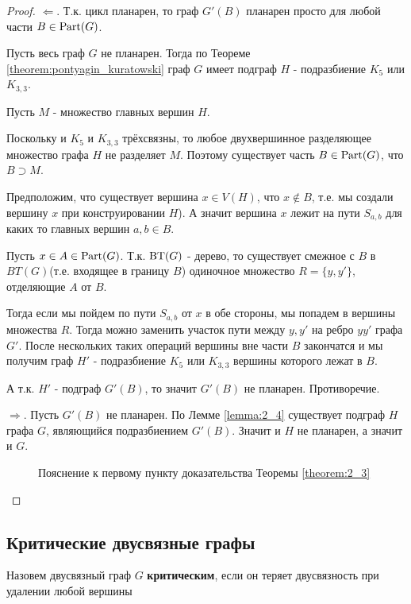 \begin{proof}
	$\Longleftarrow$. Т.к. цикл планарен, то граф $G'(B)$ планарен просто для любой части  $B \in \operatorname{Part}(G)$.

	Пусть весь граф $G$ не планарен. Тогда по Теореме \ref{theorem:pontyagin_kuratowski} граф  $G$ имеет подграф  $H$ - подразбиение  $K_5$ или  $K_{3,3}$.

	Пусть $M$ - множество главных вершин  $H$.

	Поскольку и $K_5$ и  $K_{3,3}$ трёхсвязны, то любое двухвершинное разделяющее множество графа  $H$ не разделяет $M$.
	Поэтому существует часть  $B \in \operatorname{Part}(G)$, что  $B \supset M$.

	Предположим, что существует вершина $x \in V(H)$, что  $x \not \in B$, т.е. мы создали вершину $x$ при конструировании  $H$).
	А значит вершина $x$ лежит на пути  $S_{a, b}$ для каких то главных вершин $a, b \in B$.

	Пусть $x \in A \in \operatorname{Part}(G)$.
	Т.к. $\operatorname{BT}(G)$ - дерево, то существует смежное с  $B$ в  $BT(G)$(т.е. входящее в границу $B$) одиночное множество $R = \{y, y'\}$, отделяющие $A$ от  $B$.

	Тогда если мы пойдем по пути  $S_{a, b}$ от  $x$ в обе стороны, мы попадем в вершины множества  $R$.
	Тогда можно заменить участок пути между  $y, y'$ на ребро $yy'$ графа  $G'$.
	После нескольких таких операций вершины вне части  $B$ закончатся и мы получим граф  $H'$ - подразбиение  $K_5$ или  $K_{3,3}$ вершины которого лежат в  $B$.

	А т.к.  $H'$ - подграф  $G'(B)$, то значит  $G'(B)$ не планарен. Противоречие.

	 $\Longrightarrow$. Пусть  $G'(B)$ не планарен.
	 По Лемме \ref{lemma:2_4} существует подграф  $H$ графа  $G$, являющийся подразбиением  $G'(B)$.
	 Значит и  $H$ не планарен, а значит и  $G$.


\begin{figure}[ht]
    \centering
	\caption{Пояснение к первому пункту доказательства Теоремы \ref{theorem:2_3}}
    \label{fig:theorem_2_3}
\end{figure}

\end{proof}

\subsection{Критические двусвязные графы}

\begin{df}
	Назовем двусвязный граф  $G$ \textbf{критическим}, если он  теряет двусвязность при удалении любой вершины
\end{df}

